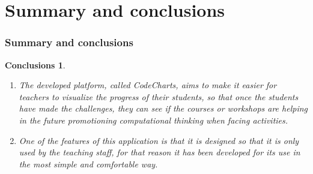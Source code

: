 \documentclass{beamer}
\newtheorem{ejemplo}{Conclusions}
\begin{document}
\section{Summary and conclusions}

\begin{frame}
\frametitle{Summary and conclusions}

\begin{ejemplo}
  \begin{enumerate}
    \item
    The developed platform, called CodeCharts, aims to make it easier for teachers to visualize the progress of their students, so that once the students have made the challenges, they can see if the courses or workshops are helping in the future promotioning computational thinking when facing activities.
      \pause
    \item
    One of the features of this application is that it is designed so that it is only used by the teaching staff, for that reason it has been developed for its use in the most simple and comfortable way.
  \end{enumerate}
\end{ejemplo}

\end{frame}
\end{document}
